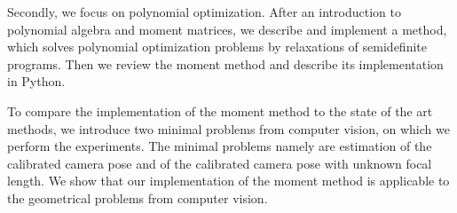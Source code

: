 Secondly, we focus on polynomial optimization.
After an introduction to polynomial algebra and moment matrices, we describe and implement a method, which solves polynomial optimization problems by relaxations of semidefinite programs.
Then we review the moment method and describe its implementation in Python.

To compare the implementation of the moment method to the state of the art methods, we introduce two minimal problems from computer vision, on which we perform the experiments.
The minimal problems namely are estimation of the calibrated camera pose and of the calibrated camera pose with unknown focal length.
We show that our implementation of the moment method is applicable to the geometrical problems from computer vision.
